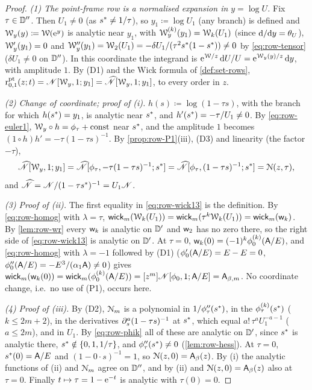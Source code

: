 \begin{proof}
\emph{(1) The point-frame row is a normalised expansion in $y=\log U$.} Fix $\tau\in\mathbb{D}''$. Then $U_1\neq0$ (as $s^{\ast}\neq1/\tau$), so $y_1\coloneqq\log U_1$ (any branch) is defined and $\mathcal{W}_y(y)\coloneqq\mathcal{W}(\mathrm{e}^y)$ is analytic near $y_1$, with $\mathcal{W}_y^{(k)}(y_1)=\mathcal{W}_k(U_1)$ (since $\mathrm{d}/\mathrm{d} y=\theta_{U}$), $\mathcal{W}_y'(y_1)=0$ and $\mathcal{W}_y''(y_1)=\mathcal{W}_2(U_1)=-\delta U_1/(\tau^2s^{\ast}(1-s^{\ast}))\neq0$ by \eqref{eq:row-tensor} ($\delta U_1\neq0$ on $\mathbb{D}''$). In this coordinate the integrand is $\mathrm{e}^{\mathcal{W}/z}\,\mathrm{d} U/U=\mathrm{e}^{\mathcal{W}_y(y)/z}\,\mathrm{d} y$, with amplitude $1$. By (D1) and the Wick formula of \cref{def:set-rows}, $\mathrm{r}^{\mathrm{pt}}_{0,1}(z;t)=\mathscr{N}[\mathcal{W}_y,1;y_1]=\widehat{\mathscr{N}}[\mathcal{W}_y,1;y_1]$, to every order in $z$.

\emph{(2) Change of coordinate; proof of (i).} $h(s)\coloneqq\log(1-\tau s)$, with the branch for which $h(s^{\ast})=y_1$, is analytic near $s^{\ast}$, and $h'(s^{\ast})=-\tau/U_1\neq0$. By \eqref{eq:row-euler1}, $\mathcal{W}_y\circ h=\phi_\tau+\mathrm{const}$ near $s^{\ast}$, and the amplitude $1$ becomes $(1\circ h)h'=-\tau(1-\tau s)^{-1}$. By \cref{prop:row-P1}(iii), (D3) and linearity (the factor $-\tau$),
\[
\widehat{\mathscr{N}}[\mathcal{W}_y,1;y_1]=\widehat{\mathscr{N}}[\phi_\tau,-\tau(1-\tau s)^{-1};s^{\ast}]=\widehat{\mathscr{N}}[\phi_\tau,(1-\tau s)^{-1};s^{\ast}]=\mathcal{N}(z,\tau),
\]
and $\widehat{\mathscr{N}}=\mathscr{N}/(1-\tau s^{\ast})^{-1}=U_1\mathscr{N}$.

\emph{(3) Proof of (ii).} The first equality in \eqref{eq:row-wick13} is the definition. By \eqref{eq:row-homog} with $\lambda=\tau$, $\mathsf{wick}_m(\mathcal{W}_k(U_1))=\mathsf{wick}_m(\tau^k\mathcal{W}_k(U_1))=\mathsf{wick}_m(\mathsf{w}_k)$. By \cref{lem:row-wr} every $\mathsf{w}_k$ is analytic on $\mathbb{D}'$ and $\mathsf{w}_2$ has no zero there, so the right side of \eqref{eq:row-wick13} is analytic on $\mathbb{D}'$. At $\tau=0$, $\mathsf{w}_k(0)=(-1)^k\phi_0^{(k)}(\mathsf{A}/E)$, and \eqref{eq:row-homog} with $\lambda=-1$ followed by (D1) ($\phi_0'(\mathsf{A}/E)=E-E=0$, $\phi_0''(\mathsf{A}/E)=-E^3/(\alpha_1\mathsf{A})\neq0$) gives $\mathsf{wick}_m(\mathsf{w}_k(0))=\mathsf{wick}_m(\phi_0^{(k)}(\mathsf{A}/E))=[z^m]\mathscr{N}[\phi_0,1;\mathsf{A}/E]=\mathsf{A}_{\beta,m}$. No coordinate change, i.e.\ no use of (P1), occurs here.

\emph{(4) Proof of (iii).} By (D2), $\mathcal{N}_m$ is a polynomial in $1/\phi_\tau''(s^{\ast})$, in the $\phi_\tau^{(k)}(s^{\ast})$ ($k\leq2m+2$), in the derivatives $\partial_s^a(1-\tau s)^{-1}$ at $s^{\ast}$, which equal $a!\,\tau^aU_1^{-a-1}$ ($a\leq2m$), and in $U_1$. By \eqref{eq:row-phik} all of these are analytic on $\mathbb{D}'$, since $s^{\ast}$ is analytic there, $s^{\ast}\notin\{0,1,1/\tau\}$, and $\phi_\tau''(s^{\ast})\neq0$ (\cref{lem:row-hess}). At $\tau=0$, $s^{\ast}(0)=\mathsf{A}/E$ and $(1-0\cdot s)^{-1}=1$, so $\mathcal{N}(z,0)=\mathsf{A}_{\beta}(z)$. By (i) the analytic functions of (ii) and $\mathcal{N}_m$ agree on $\mathbb{D}''$, and by (ii) and $\mathcal{N}(z,0)=\mathsf{A}_{\beta}(z)$ also at $\tau=0$. Finally $t\mapsto\tau=1-\mathrm{e}^{-t}$ is analytic with $\tau(0)=0$.
\end{proof}

